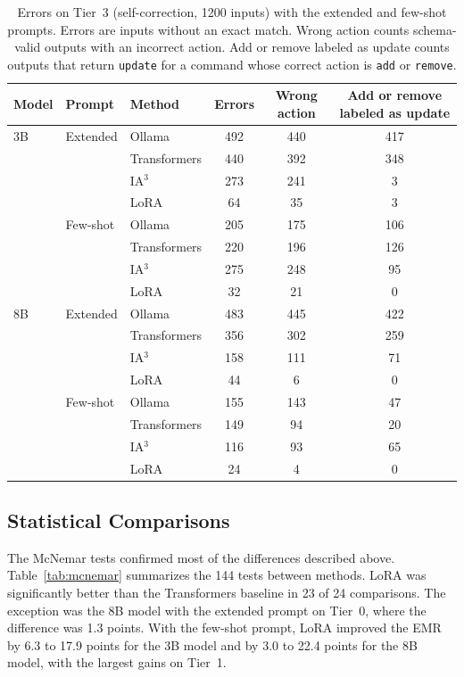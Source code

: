 \documentclass[journal,article,submit,pdftex,moreauthors]{Definitions/mdpi}
\begin{document}
\begin{table}[H]
\caption{Errors on Tier~3 (self-correction, 1200 inputs) with the extended and few-shot prompts. Errors are inputs without an exact match. Wrong action counts schema-valid outputs with an incorrect action. Add or remove labeled as update counts outputs that return \texttt{update} for a command whose correct action is \texttt{add} or \texttt{remove}.\label{tab:tier3}}
\begin{tabularx}{\textwidth}{lllCCC}
\toprule
Model & Prompt & Method & Errors & Wrong action & Add or remove labeled as update \\
\midrule
3B & Extended & Ollama & 492 & 440 & 417 \\
 &  & Transformers & 440 & 392 & 348 \\
 &  & IA$^3$ & 273 & 241 & 3 \\
 &  & LoRA & 64 & 35 & 3 \\
\midrule
 & Few-shot & Ollama & 205 & 175 & 106 \\
 &  & Transformers & 220 & 196 & 126 \\
 &  & IA$^3$ & 275 & 248 & 95 \\
 &  & LoRA & 32 & 21 & 0 \\
\midrule
8B & Extended & Ollama & 483 & 445 & 422 \\
 &  & Transformers & 356 & 302 & 259 \\
 &  & IA$^3$ & 158 & 111 & 71 \\
 &  & LoRA & 44 & 6 & 0 \\
\midrule
 & Few-shot & Ollama & 155 & 143 & 47 \\
 &  & Transformers & 149 & 94 & 20 \\
 &  & IA$^3$ & 116 & 93 & 65 \\
 &  & LoRA & 24 & 4 & 0 \\
\bottomrule
\end{tabularx}
\end{table}

\subsection{Statistical Comparisons}\label{sec:res-stats}

The McNemar tests confirmed most of the differences described above. Table~\ref{tab:mcnemar} summarizes the 144 tests between methods. LoRA was significantly better than the Transformers baseline in 23 of 24 comparisons. The exception was the 8B model with the extended prompt on Tier~0, where the difference was 1.3 points. With the few-shot prompt, LoRA improved the EMR by 6.3 to 17.9 points for the 3B model and by 3.0 to 22.4 points for the 8B model, with the largest gains on Tier~1.
\end{document}
